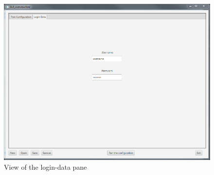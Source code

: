 \begin{figure}[h!]
\centering
\includegraphics[width=\textwidth]{gui_login.png}
\caption{View of the login-data pane}
\end{figure}
